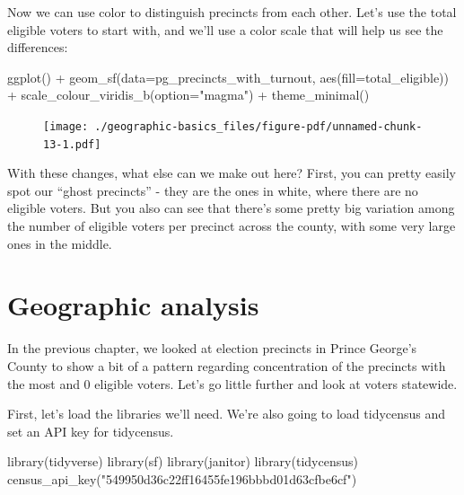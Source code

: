 \documentclass[
  letterpaper,
  DIV=11,
  numbers=noendperiod]{scrreprt}
\newenvironment{Shaded}{\begin{snugshade}}{\end{snugshade}}
\newcommand{\AttributeTok}[1]{\textcolor[rgb]{0.40,0.45,0.13}{#1}}
\newcommand{\FunctionTok}[1]{\textcolor[rgb]{0.28,0.35,0.67}{#1}}
\newcommand{\NormalTok}[1]{\textcolor[rgb]{0.00,0.23,0.31}{#1}}
\newcommand{\SpecialCharTok}[1]{\textcolor[rgb]{0.37,0.37,0.37}{#1}}
\newcommand{\StringTok}[1]{\textcolor[rgb]{0.13,0.47,0.30}{#1}}
\begin{document}
Now we can use color to distinguish precincts from each other. Let's use
the total eligible voters to start with, and we'll use a color scale
that will help us see the differences:

\begin{Shaded}
\begin{Highlighting}[]
\FunctionTok{ggplot}\NormalTok{() }\SpecialCharTok{+}
  \FunctionTok{geom\_sf}\NormalTok{(}\AttributeTok{data=}\NormalTok{pg\_precincts\_with\_turnout, }\FunctionTok{aes}\NormalTok{(}\AttributeTok{fill=}\NormalTok{total\_eligible)) }\SpecialCharTok{+}
  \FunctionTok{scale\_colour\_viridis\_b}\NormalTok{(}\AttributeTok{option=}\StringTok{"magma"}\NormalTok{) }\SpecialCharTok{+}
  \FunctionTok{theme\_minimal}\NormalTok{()}
\end{Highlighting}
\end{Shaded}

\begin{figure}[H]

{\centering \texttt{[image: ./geographic-basics\_files/figure-pdf/unnamed-chunk-13-1.pdf]}

}

\end{figure}

With these changes, what else can we make out here? First, you can
pretty easily spot our ``ghost precincts'' - they are the ones in white,
where there are no eligible voters. But you also can see that there's
some pretty big variation among the number of eligible voters per
precinct across the county, with some very large ones in the middle.


\hypertarget{geographic-analysis}{%
\chapter{Geographic analysis}\label{geographic-analysis}}

In the previous chapter, we looked at election precincts in Prince
George's County to show a bit of a pattern regarding concentration of
the precincts with the most and 0 eligible voters. Let's go little
further and look at voters statewide.

First, let's load the libraries we'll need. We're also going to load
tidycensus and set an API key for tidycensus.

\begin{Shaded}
\begin{Highlighting}[]
\FunctionTok{library}\NormalTok{(tidyverse)}
\FunctionTok{library}\NormalTok{(sf)}
\FunctionTok{library}\NormalTok{(janitor)}
\FunctionTok{library}\NormalTok{(tidycensus)}
\FunctionTok{census\_api\_key}\NormalTok{(}\StringTok{"549950d36c22ff16455fe196bbbd01d63cfbe6cf"}\NormalTok{)}
\end{Highlighting}
\end{Shaded}
\end{document}
